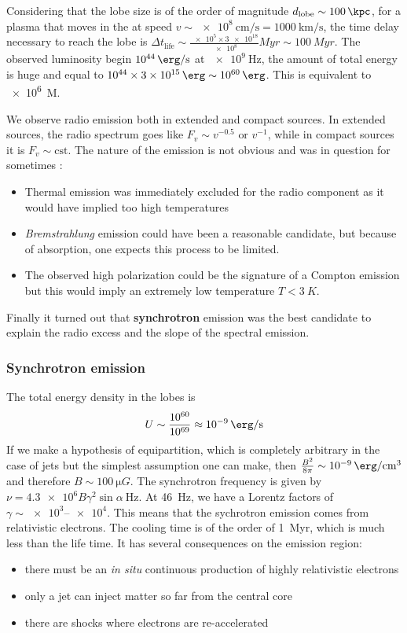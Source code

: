 \documentclass[10pt,a4paper,english,draft]{article}
\begin{document}
Considering that the lobe size is of the order of magnitude $d_\mathrm{lobe}\sim \SI{100}{\kpc}$, for a plasma that moves in the at speed $v\sim \SI{e8}{\cm\per\s} = \SI{1000}{\km\per\s}$, the time delay necessary to reach the lobe is $\Delta t_\mathrm{life} \sim \frac{\num{e5}\times\num{3e18}}{\num{e8}} \si{Myr} \sim \SI{100}{Myr}$. The observed luminosity begin $\SI{e44}{\erg\per\s}$ at $\SI{e9}{\Hz}$, the amount of total energy is huge and equal to $\num{e44}\times\SI{3e15}{\erg} \sim \SI{e60}{\erg}$. This is equivalent to \SI{e6}{M_\odot}.

We observe radio emission both in extended and compact sources. In extended sources, the radio spectrum goes like $F_v \sim v^{-0.5} \textrm{ or } v^{-1}$, while in compact sources it is $F_v \sim \mathrm{cst}$. The nature of the emission is not obvious and was in question for sometimes :
\begin{itemize}
\item Thermal emission was immediately excluded for the radio component as it would have implied too high temperatures
\item \emph{Bremstrahlung} emission could have been a reasonable candidate, but because of absorption, one expects this process to be limited.
\item The observed high polarization could be the signature of a Compton emission but this would imply an extremely low temperature $T < \SI{3}{K}$.
\end{itemize}

Finally it turned out that \textbf{synchrotron} emission was the best candidate to explain the radio excess and the slope of the spectral emission.
\subsubsection{Synchrotron emission}
The total energy density in the lobes is
\begin{equation}
  U \sim \frac{10^{60}}{10^{69}} \approx \SI{e-9}{\erg\per\s}
\end{equation}
If we make a hypothesis of equipartition, which is completely arbitrary in the case of jets but the simplest assumption one can make, then $\frac{B^2}{8\pi} \sim \SI{e-9}{\erg\per\cm\cubed}$ and therefore $B \sim \SI{100}{\micro G}$. The synchrotron frequency is given by $\nu = \num{4.3e6} B\gamma^2 \sin\alpha\ \si{\Hz}$. At \SI{46}{Hz}, we have a Lorentz factors of $\gamma \sim \numrange{e3}{e4}$. This means that the sychrotron emission comes from relativistic electrons. The cooling time is of the order of \SI{1}{Myr}, which is much less than the life time. It has several consequences on the emission region:
\begin{itemize}
\item there must be an \emph{in situ} continuous production of highly relativistic electrons
\item only a jet can inject matter so far from the central core
\item there are shocks where electrons are re-accelerated
\end{itemize}
\end{document}
